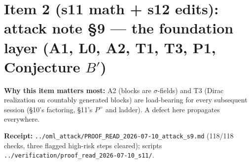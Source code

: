 \documentclass[11pt]{article}
\newcommand{\file}[1]{\texttt{\small #1}}
\begin{document}
\section{Item 2 (s11 math + s12 edits): attack note \S9 --- the
foundation layer (A1, L0, A2, T1, T3, P1, Conjecture $B'$)}

\noindent\textbf{Why this item matters most:} A2 (blocks are
$\sigma$-fields) and T3 (Dirac realization on countably generated
blocks) are load-bearing for every subsequent session (\S10's
factoring, \S11's $P^=$ and ladder). A defect here propagates
everywhere.

\noindent\textbf{Receipt:} \file{../oml\_attack/PROOF\_READ\_2026-07-10\_attack\_s9.md}
(118/118 checks, three flagged high-risk steps cleared);
scripts \file{../verification/proof\_read\_2026-07-10\_s11/}.
\end{document}
